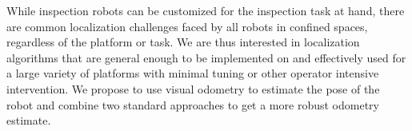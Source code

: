 \documentclass[letterpaper, 10 pt, conference]{ieeeconf}
\begin{document}
While inspection robots can be customized for the inspection task at hand, there are common localization challenges faced by all robots in confined spaces, regardless of the platform or task. We are thus interested in localization algorithms that are general enough to be implemented on and effectively used for  a large variety of platforms with minimal tuning or other operator intensive intervention. We propose to use visual odometry to estimate the pose of the robot and combine two standard approaches to get a more robust odometry estimate.

\end{document}
